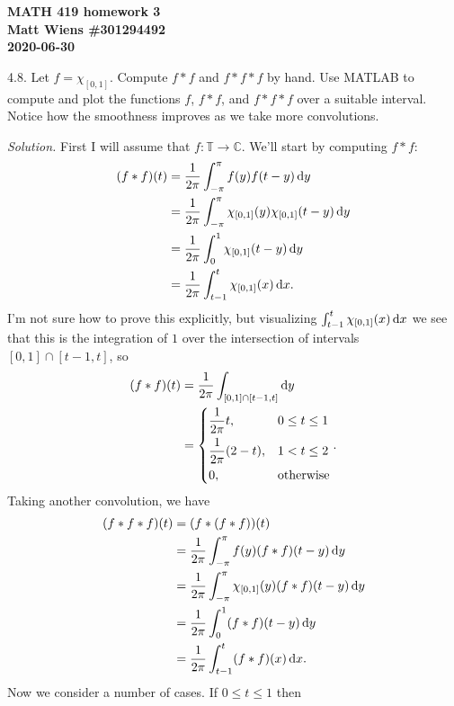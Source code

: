 \documentclass{article}
\newcommand{\T}{\mathbb{T}}
\newcommand{\C}{\mathbb{C}}
\begin{document}
\textbf{MATH 419 homework 3} \\
\textbf{Matt Wiens \#301294492} \\
\textbf{2020-06-30}

4.8. Let $f = \chi_{[0, 1]}$. Compute $f * f$ and $f * f * f$ by hand.
Use MATLAB to compute and plot the functions $f$, $f * f$, and
$f * f * f$ over a suitable interval. Notice how the smoothness improves
as we take more convolutions.

\textit{Solution.}
First I will assume that $f: \T \to \C$. We'll start by computing
$f * f$:
%
\begin{align*}
    (f * f)(t)
        &= \frac{1}{2 \pi} \int_{-\pi}^\pi f(y) f(t - y) \dif y \\
        &= \frac{1}{2 \pi} \int_{-\pi}^\pi \chi_{[0, 1]}(y) \chi_{[0, 1]}(t - y) \dif y \\
        &= \frac{1}{2 \pi} \int_0^1 \chi_{[0, 1]}(t - y) \dif y \\
        &= \frac{1}{2 \pi} \int_{t - 1}^t \chi_{[0, 1]}(x) \dif x
    .
\end{align*}
%
I'm not sure how to prove this explicitly, but visualizing
$\int_{t - 1}^t \chi_{[0, 1]}(x) \dif x$ we see that this is the
integration of $1$ over the intersection of intervals
$[0, 1] \cap [t - 1, t]$, so
%
\begin{align*}
    (f * f)(t)
        &= \frac{1}{2 \pi} \int_{[0, 1] \cap [t - 1, t]} \dif y \\
        &=
        \begin{dcases}
            \frac{1}{2 \pi}t, & 0 \leq t \leq 1 \\
            \frac{1}{2 \pi} (2 - t), & 1 < t \leq 2 \\
            0, & \text{otherwise}
        \end{dcases}
        .
\end{align*}
%
Taking another convolution, we have
%
\begin{align*}
    (f * f * f)(t)
        &= (f * (f * f))(t) \\
        &= \frac{1}{2 \pi} \int_{-\pi}^\pi f(y) (f * f)(t - y) \dif y \\
        &= \frac{1}{2 \pi} \int_{-\pi}^\pi \chi_{[0, 1]}(y) (f * f)(t - y) \dif y \\
        &= \frac{1}{2 \pi} \int_0^1 (f * f)(t - y) \dif y \\
        &= \frac{1}{2 \pi} \int_{t - 1}^t (f * f)(x) \dif x
        .
\end{align*}
%
Now we consider a number of cases. If $0 \leq t \leq 1$ then
\end{document}
